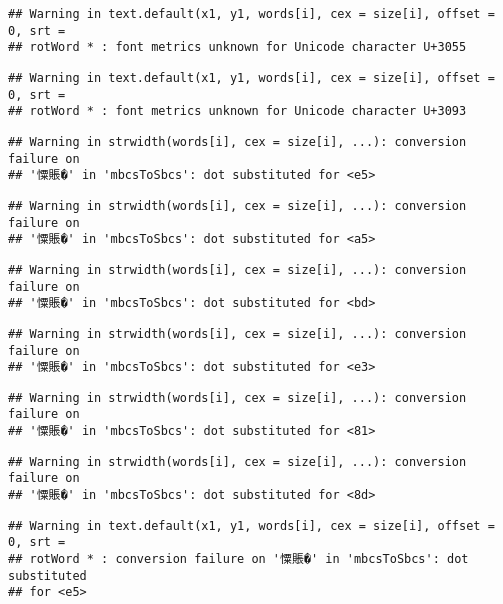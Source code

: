 \documentclass[]{article}
\begin{document}
\begin{verbatim}
## Warning in text.default(x1, y1, words[i], cex = size[i], offset = 0, srt =
## rotWord * : font metrics unknown for Unicode character U+3055
\end{verbatim}

\begin{verbatim}
## Warning in text.default(x1, y1, words[i], cex = size[i], offset = 0, srt =
## rotWord * : font metrics unknown for Unicode character U+3093
\end{verbatim}

\begin{verbatim}
## Warning in strwidth(words[i], cex = size[i], ...): conversion failure on
## '憟賬�' in 'mbcsToSbcs': dot substituted for <e5>
\end{verbatim}

\begin{verbatim}
## Warning in strwidth(words[i], cex = size[i], ...): conversion failure on
## '憟賬�' in 'mbcsToSbcs': dot substituted for <a5>
\end{verbatim}

\begin{verbatim}
## Warning in strwidth(words[i], cex = size[i], ...): conversion failure on
## '憟賬�' in 'mbcsToSbcs': dot substituted for <bd>
\end{verbatim}

\begin{verbatim}
## Warning in strwidth(words[i], cex = size[i], ...): conversion failure on
## '憟賬�' in 'mbcsToSbcs': dot substituted for <e3>
\end{verbatim}

\begin{verbatim}
## Warning in strwidth(words[i], cex = size[i], ...): conversion failure on
## '憟賬�' in 'mbcsToSbcs': dot substituted for <81>
\end{verbatim}

\begin{verbatim}
## Warning in strwidth(words[i], cex = size[i], ...): conversion failure on
## '憟賬�' in 'mbcsToSbcs': dot substituted for <8d>
\end{verbatim}

\begin{verbatim}
## Warning in text.default(x1, y1, words[i], cex = size[i], offset = 0, srt =
## rotWord * : conversion failure on '憟賬�' in 'mbcsToSbcs': dot substituted
## for <e5>
\end{verbatim}
\end{document}
